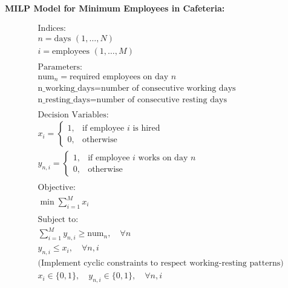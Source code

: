 \documentclass{article}
\begin{document}
\textbf{MILP Model for Minimum Employees in Cafeteria:}

\begin{align*}
    & \text{Indices:} \\
    & n = \text{days } (1, \ldots, N) \\
    & i = \text{employees } (1, \ldots, M) \\
    \\
    & \text{Parameters:} \\
    & \text{num}_n = \text{required employees on day } n \\
    & \text{n\_working\_days} = \text{number of consecutive working days} \\
    & \text{n\_resting\_days} = \text{number of consecutive resting days} \\
    \\
    & \text{Decision Variables:} \\
    & x_i = 
    \begin{cases} 
    1, & \text{if employee } i \text{ is hired} \\ 
    0, & \text{otherwise}
    \end{cases} \\
    & y_{n,i} = 
    \begin{cases} 
    1, & \text{if employee } i \text{ works on day } n \\ 
    0, & \text{otherwise}
    \end{cases} \\
    \\
    & \text{Objective:} \\
    & \min \sum_{i=1}^{M} x_i \\
    \\
    & \text{Subject to:} \\
    & \sum_{i=1}^{M} y_{n,i} \geq \text{num}_n, \quad \forall n \\
    & y_{n,i} \leq x_i, \quad \forall n, i \\
    & \text{(Implement cyclic constraints to respect working-resting patterns)} \\
    & x_i \in \{0, 1\}, \quad y_{n,i} \in \{0, 1\}, \quad \forall n, i \\
\end{align*}
\end{document}
